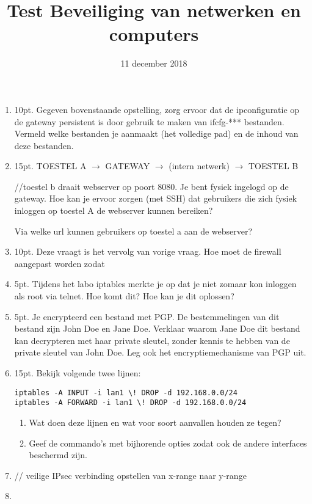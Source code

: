 \documentclass{article}
\def\note#1{\color{cyan} #1 \color{black}}
\begin{document}
\title{Test Beveiliging van netwerken en computers}
\date{11 december 2018}
\author{}
\maketitle
\begin{enumerate}
    \item \note{10pt.} Gegeven bovenstaande opstelling, zorg ervoor dat de ipconfiguratie op de gateway persistent is door gebruik te maken van ifcfg-*** bestanden. Vermeld welke bestanden je aanmaakt (het volledige pad) en de inhoud van deze bestanden.
    \item \note{15pt.} TOESTEL A $\rightarrow$ GATEWAY $\rightarrow$ (intern netwerk) $\rightarrow$ TOESTEL B

        //toestel b draait webserver op poort 8080. Je bent fysiek ingelogd op de gateway. Hoe kan je ervoor zorgen (met SSH) dat gebruikers die zich fysiek inloggen op toestel A de webserver kunnen bereiken?

        Via welke url kunnen gebruikers op toestel a aan de webserver?
    \item \note{10pt.} Deze vraagt is het vervolg van vorige vraag. Hoe moet de firewall aangepast worden zodat 
    \item \note{5pt.} Tijdens het labo iptables merkte je op dat je niet zomaar kon inloggen als root via telnet. Hoe komt dit? Hoe kan je dit oplossen?
    \item \note{5pt.} Je encrypteerd een bestand met PGP. De bestemmelingen van dit bestand zijn John Doe en Jane Doe. Verklaar waarom Jane Doe dit bestand kan decrypteren met haar private sleutel, zonder kennis te hebben van de private sleutel van John Doe. Leg ook het encryptiemechanisme van PGP uit.
    \item \note{15pt.} Bekijk volgende twee lijnen:
    \begin{lstlisting}
iptables -A INPUT -i lan1 \! DROP -d 192.168.0.0/24
iptables -A FORWARD -i lan1 \! DROP -d 192.168.0.0/24
    \end{lstlisting}
    \begin{enumerate}
        \item Wat doen deze lijnen en wat voor soort aanvallen houden ze tegen?
        \item Geef de commando's met bijhorende opties zodat ook de andere interfaces beschermd zijn. 
    \end{enumerate}

    \item // veilige IPsec verbinding opstellen van x-range naar y-range
    \item 
    

\end{enumerate}
\end{document}
